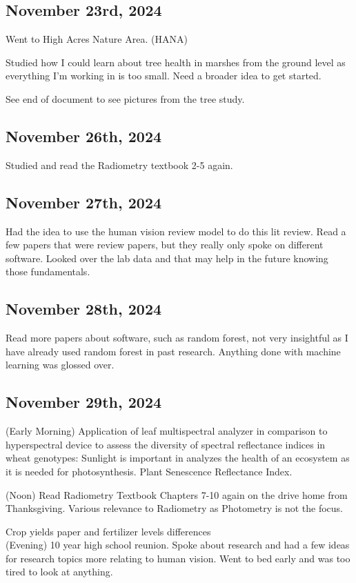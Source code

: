 \documentclass{article}
\begin{document}
\subsection{November 23rd, 2024}
Went to High Acres Nature Area. (HANA) 

Studied how I could learn about tree health in marshes from the ground level as everything I'm working in is too small. Need a broader idea to get started. 

See end of document to see pictures from the tree study. 


\subsection{November 26th, 2024}
Studied and read the Radiometry textbook 2-5 again. 

\subsection{November 27th, 2024}
Had the idea to use the human vision review model to do this lit review. Read a few papers that were review papers, but they really only spoke on different software. Looked over the lab data and that may help in the future knowing those fundamentals. 



\subsection{November 28th, 2024}
Read more papers about software, such as random forest, not very insightful as I have already used random forest in past research. Anything done with machine learning was glossed over.  

\subsection{November 29th, 2024}

(Early Morning) Application of leaf multispectral analyzer in comparison to hyperspectral device to assess the diversity of spectral reflectance indices in wheat genotypes: Sunlight is important in analyzes the health of an ecosystem as it is needed for photosynthesis. 
Plant Senescence Reflectance Index. 

(Noon) Read Radiometry Textbook Chapters 7-10 again on the drive home from Thanksgiving. Various relevance to Radiometry as Photometry is not the focus. 

Crop yields paper and fertilizer levels differences\\
(Evening) 10 year high school reunion. Spoke about research and had a few ideas for research topics more relating to human vision. 
Went to bed early and was too tired to look at anything. 
\end{document}
